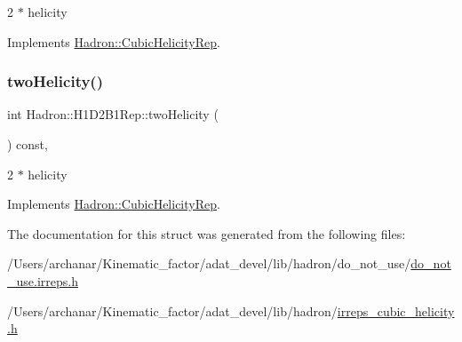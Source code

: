 2 $\ast$ helicity 

Implements \mbox{\hyperlink{structHadron_1_1CubicHelicityRep_af507aa56fc2747eacc8cb6c96db31ecc}{Hadron\+::\+Cubic\+Helicity\+Rep}}.

\mbox{\label{structHadron_1_1H1D2B1Rep_a3cc2db9e517e6a40e7205a5dbc9b32c9}} 
\subsubsection{\texorpdfstring{twoHelicity()}{twoHelicity()}\hspace{0.1cm}{\footnotesize\ttfamily [2/2]}}
{\footnotesize\ttfamily int Hadron\+::\+H1\+D2\+B1\+Rep\+::two\+Helicity (\begin{DoxyParamCaption}{ }\end{DoxyParamCaption}) const\hspace{0.3cm}{\ttfamily [inline]}, {\ttfamily [virtual]}}

2 $\ast$ helicity 

Implements \mbox{\hyperlink{structHadron_1_1CubicHelicityRep_af507aa56fc2747eacc8cb6c96db31ecc}{Hadron\+::\+Cubic\+Helicity\+Rep}}.



The documentation for this struct was generated from the following files\+:\begin{DoxyCompactItemize}
\item 
/\+Users/archanar/\+Kinematic\+\_\+factor/adat\+\_\+devel/lib/hadron/do\+\_\+not\+\_\+use/\mbox{\hyperlink{do__not__use_8irreps_8h}{do\+\_\+not\+\_\+use.\+irreps.\+h}}\item 
/\+Users/archanar/\+Kinematic\+\_\+factor/adat\+\_\+devel/lib/hadron/\mbox{\hyperlink{lib_2hadron_2irreps__cubic__helicity_8h}{irreps\+\_\+cubic\+\_\+helicity.\+h}}\end{DoxyCompactItemize}
